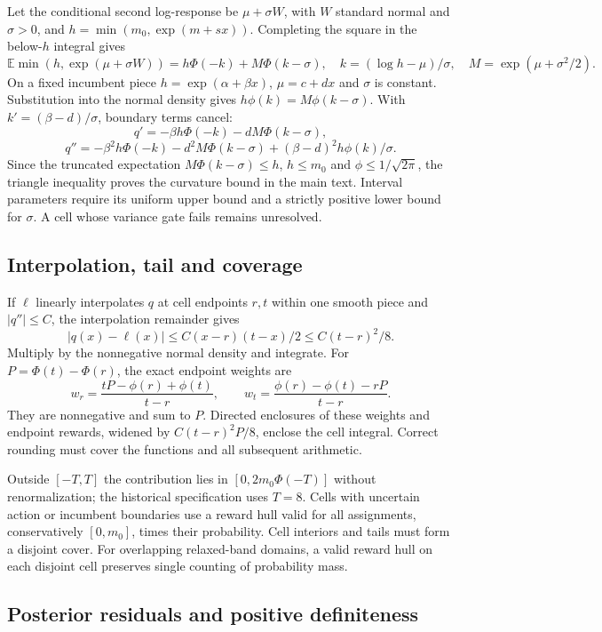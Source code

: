 Let the conditional second log-response be $\mu+\sigma W$, with $W$ standard normal and $\sigma>0$, and $h=\min(m_0,\exp(m+sx))$. Completing the square in the below-$h$ integral gives
\[
\mathbb E\min(h,\exp(\mu+\sigma W))
=h\Phi(-k)+M\Phi(k-\sigma),
\quad k=(\log h-\mu)/\sigma,\quad M=\exp(\mu+\sigma^2/2).
\]
On a fixed incumbent piece $h=\exp(\alpha+\beta x)$, $\mu=c+dx$ and $\sigma$ is constant. Substitution into the normal density gives $h\phi(k)=M\phi(k-\sigma)$. With $k'=(\beta-d)/\sigma$, boundary terms cancel:
\[
q'=-\beta h\Phi(-k)-dM\Phi(k-\sigma),
\]
\[
q''=-\beta^2h\Phi(-k)-d^2M\Phi(k-\sigma)
                         +(\beta-d)^2h\phi(k)/\sigma.
\]
Since the truncated expectation $M\Phi(k-\sigma)\le h$, $h\le m_0$ and $\phi\le1/\sqrt{2\pi}$, the triangle inequality proves the curvature bound in the main text. Interval parameters require its uniform upper bound and a strictly positive lower bound for $\sigma$. A cell whose variance gate fails remains unresolved.

\subsection{Interpolation, tail and coverage}

If $\ell$ linearly interpolates $q$ at cell endpoints $r,t$ within one smooth piece and $|q''|\le C$, the interpolation remainder gives
\[
|q(x)-\ell(x)|\le C(x-r)(t-x)/2\le C(t-r)^2/8.
\]
Multiply by the nonnegative normal density and integrate. For $P=\Phi(t)-\Phi(r)$, the exact endpoint weights are
\[
w_r=\frac{tP-\phi(r)+\phi(t)}{t-r},\qquad
w_t=\frac{\phi(r)-\phi(t)-rP}{t-r}.
\]
They are nonnegative and sum to $P$. Directed enclosures of these weights and endpoint rewards, widened by $C(t-r)^2P/8$, enclose the cell integral. Correct rounding must cover the functions and all subsequent arithmetic.

Outside $[-T,T]$ the contribution lies in $[0,2m_0\Phi(-T)]$ without renormalization; the historical specification uses $T=8$. Cells with uncertain action or incumbent boundaries use a reward hull valid for all assignments, conservatively $[0,m_0]$, times their probability. Cell interiors and tails must form a disjoint cover. For overlapping relaxed-band domains, a valid reward hull on each disjoint cell preserves single counting of probability mass.

\subsection{Posterior residuals and positive definiteness}

